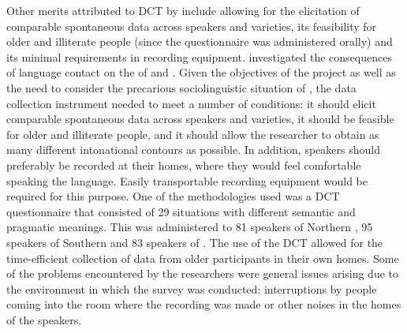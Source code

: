 \documentclass[output=paper]{LSP/langsci}
\begin{document}
Other merits attributed to DCT by \citet{Sichel-Bazin2015} include allowing for the elicitation of comparable spontaneous data across speakers and varieties, its feasibility for older and illiterate people (since the questionnaire was administered orally) and its minimal requirements in recording equipment. \citet{Sichel-Bazin2015} investigated the consequences of language contact on the  of  and . Given the objectives of the project as well as the need to consider the precarious sociolinguistic situation of , the data collection instrument needed to meet a number of conditions: it should elicit comparable spontaneous data across speakers and varieties, it should be feasible for older and illiterate people, and it should allow the researcher to obtain as many different intonational contours as possible. In addition,  speakers should preferably be recorded at their homes, where they would feel comfortable speaking the language. Easily transportable recording equipment would be required for this purpose. One of the methodologies used was a DCT questionnaire that consisted of 29 situations with different semantic and pragmatic meanings. This was administered to 81 speakers of Northern , 95 speakers of Southern  and 83 speakers of . The use of the DCT allowed for the time-efficient collection of data from older participants in their own homes. Some of the problems encountered by the researchers were general issues arising due to the environment in which the survey was conducted: interruptions by people coming into the room where the recording was made or other noises in the homes of the speakers. 
\end{document}
